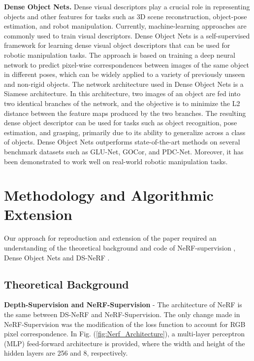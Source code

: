 \documentclass[conference]{IEEEtran}
\begin{document}
\textbf{Dense Object Nets.} Dense visual descriptors play a crucial role in representing objects and other features for tasks such as 3D scene reconstruction, object-pose estimation, and robot manipulation. Currently, machine-learning approaches are commonly used to train visual descriptors. Dense Object Nets \cite{florencemanuelli2018dense} is a self-supervised framework for learning dense visual object descriptors that can be used for robotic manipulation tasks. The approach is based on training a deep neural network to predict pixel-wise correspondences between images of the same object in different poses, which can be widely applied to a variety of previously unseen and non-rigid objects. The network architecture used in Dense Object Nets is a Siamese architecture. In this architecture, two images of an object are fed into two identical branches of the network, and the objective is to minimize the L2 distance between the feature maps produced by the two branches. The resulting dense object descriptor can be used for tasks such as object recognition, pose estimation, and grasping, primarily due to its ability to generalize across a class of objects. Dense Object Nets outperforms state-of-the-art methods on several benchmark datasets such as GLU-Net, GOCor, and PDC-Net. Moreover, it has been demonstrated to work well on real-world robotic manipulation tasks. \vspace{2mm}

\section{Methodology and Algorithmic Extension}

Our approach for reproduction and extension of the paper required an understanding of the theoretical background and code of NeRF-supervision \cite{yen2022nerfsupervision}, Dense Object Nets \cite{florencemanuelli2018dense} and DS-NeRF \cite{deng2022depthsupervised}.

\subsection{Theoretical Background}

\textbf{Depth-Supervision and NeRF-Supervision} - 
The architecture of NeRF is the same between DS-NeRF and NeRF-Supervision. The only change made in NeRF-Supervision was the modification of the loss function to account for RGB pixel correspondence. In Fig. (\ref{fig:Nerf_Architecture}), a multi-layer perceptron (MLP) feed-forward architecture is provided, where the width and height of the hidden layers are 256 and 8, respectively.
    
\end{document}
